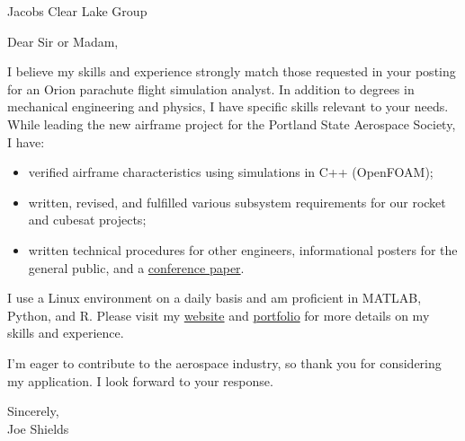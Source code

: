 \documentclass[letterpaper]{letter}
\begin{document}
\large

\begin{letter}{Jacobs Clear Lake Group}
\opening{Dear Sir or Madam,}

I believe my skills and experience strongly match those requested in your posting for an Orion parachute flight simulation analyst. 
In addition to degrees in mechanical engineering and physics, I have specific skills relevant to your needs.
While leading the new airframe project for the Portland State Aerospace Society, I have: 
\begin{itemize}
	\item verified airframe characteristics using simulations in C++ (OpenFOAM);
	\item written, revised, and fulfilled various subsystem requirements for our rocket and cubesat projects;
	\item written technical procedures for other engineers, informational posters for the general public, and a \href{http://arc.aiaa.org/doi/pdf/10.2514/6.2016-5365}{conference paper}.
\end{itemize}
I use a Linux environment on a daily basis and am proficient in MATLAB, Python, and R.
Please visit my \href{http://joedang.github.io}{website} and \href{http://github.com/Joedang/Portfolio}{portfolio} for more details on my skills and experience.

I'm eager to contribute to the aerospace industry, so thank you for considering my application. I look forward to your response. 

\closing{Sincerely,\\ Joe Shields}
\end{letter}
\end{document}
